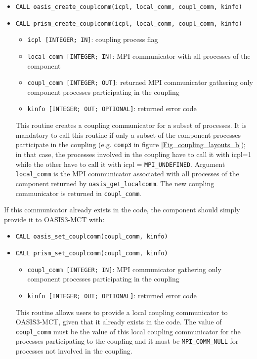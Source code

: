 \begin{itemize}
\item {\tt CALL oasis\_create\_couplcomm(icpl, local\_comm,
    coupl\_comm, kinfo)}
\item {\tt CALL prism\_create\_couplcomm(icpl, local\_comm,
    coupl\_comm, kinfo)}
  \begin{itemize}
  \item {\tt icpl [INTEGER; IN]}: coupling process flag
  \item {\tt local\_comm [INTEGER; IN]}: MPI communicator with all
    processes of the component
  \item {\tt coupl\_comm [INTEGER; OUT]}: returned MPI communicator
    gathering only component processes participating in the coupling
  \item {\tt kinfo [INTEGER; OUT; OPTIONAL]}: returned error code
  \end{itemize}

  This routine creates a coupling communicator for a subset of
  processes. It is mandatory to call this routine if only a subset of
  the component processes participate in the coupling (e.g. {\tt comp3} in figure
    \ref{Fig_coupling_layouts_b}); in that case, the processes
    involved in the coupling have to call it with icpl=1 while the
    other have to call it with icpl = {\tt MPI\_UNDEFINED}. Argument
   {\tt  local\_comm} is the MPI communicator associated with all processes
    of the component returned by {\tt oasis\_get\_localcomm}. The new coupling 
    communicator is returned in {\tt coupl\_comm}.

\end{itemize}
If this communicator already exists in the code, the component should
simply provide it to OASIS3-MCT with:

\begin{itemize}
\item {\tt CALL oasis\_set\_couplcomm(coupl\_comm, kinfo)}
\item {\tt CALL prism\_set\_couplcomm(coupl\_comm, kinfo)}
  \begin{itemize}
  \item {\tt coupl\_comm [INTEGER; IN]}: MPI communicator gathering
    only component processes participating in the coupling
  \item {\tt kinfo [INTEGER; OUT; OPTIONAL]}: returned error code
  \end{itemize}

  This routine allows users to provide a local coupling communicator to
  OASIS3-MCT, given that it already exists in the code. The value of
  {\tt coupl\_comm} must be the value of this local coupling
  communicator for the processes participating to the coupling and it
  must be {\tt MPI\_COMM\_NULL} for processes not involved in the
  coupling.
\end{itemize}

